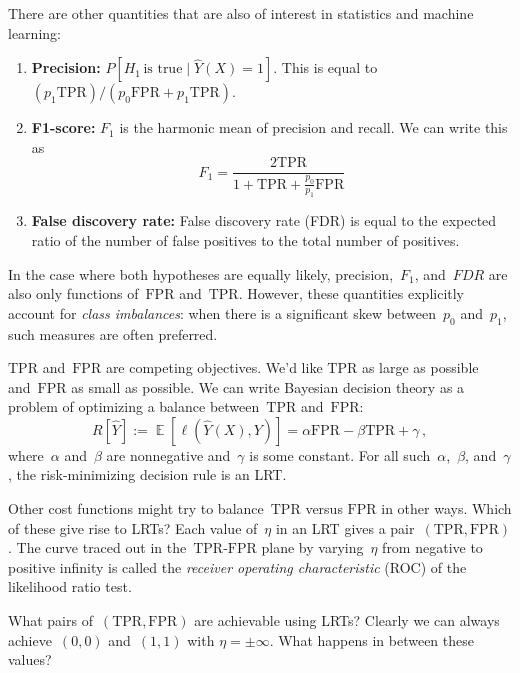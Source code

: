 \documentclass{tufte-book}
\begin{document}
There are other quantities that are also of interest in statistics and
machine learning:

\begin{enumerate}
\def\labelenumi{\arabic{enumi}.}
\tightlist
\item
  \textbf{Precision:} \(P[H_1\,\text{is true} \mid \hat{Y}(X)=1]\). This
  is equal to
  \((p_1 \mathrm{TPR})/(p_0 \mathrm{FPR}+p_1 \mathrm{TPR})\).
\item
  \textbf{F1-score:} \(F_1\) is the harmonic mean of precision and
  recall. We can write this as \[
  F_1 = \frac{2 \mathrm{TPR}}{1+\mathrm{TPR}+\tfrac{p_0}{p_1} \mathrm{FPR}}
  \]
\item
  \textbf{False discovery rate:} False discovery rate (FDR) is equal to
  the expected ratio of the number of false positives to the total
  number of positives.
\end{enumerate}


In the case where both hypotheses are equally likely,
precision,~\(F_1\), and~\(FDR\) are also only functions
of~\(\mathrm{FPR}\) and~\(\mathrm{TPR}\). However, these quantities
explicitly account for \emph{class imbalances}: when there is a
significant skew between~\(p_0\) and~\(p_1\), such measures are often
preferred.

\(\mathrm{TPR}\) and~\(\mathrm{FPR}\) are competing objectives. We'd
like \(\mathrm{TPR}\) as large as possible and~\(\mathrm{FPR}\) as small
as possible. We can write Bayesian decision theory as a problem of
optimizing a balance between~\(\mathrm{TPR}\) and~\(\mathrm{FPR}\): \[
        R[\hat{Y}] := \mathop\mathbb{E}[\ell(\hat{Y}(X),Y)] = \alpha \mathrm{FPR} - \beta \mathrm{TPR} + \gamma\,,
\] where~\(\alpha\) and~\(\beta\) are nonnegative and~\(\gamma\) is some
constant. For all such~\(\alpha\),~\(\beta\), and~\(\gamma\), the
risk-minimizing decision rule is an LRT.

Other cost functions might try to balance~\(\mathrm{TPR}\) versus
\(\mathrm{FPR}\) in other ways. Which of these give rise to LRTs? Each
value of~\(\eta\) in an LRT gives a
pair~\((\mathrm{TPR},\mathrm{FPR})\). The curve traced out in
the~\(\mathrm{TPR}\)-\(\mathrm{FPR}\) plane by varying~\(\eta\) from
negative to positive infinity is called the \emph{receiver operating
characteristic} (ROC) of the likelihood ratio test.

What pairs of~\((\mathrm{TPR},\mathrm{FPR})\) are achievable using LRTs?
Clearly we can always achieve~\((0,0)\) and~\((1,1)\) with
\(\eta=\pm \infty\). What happens in between these values?
\end{document}
